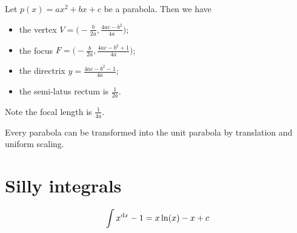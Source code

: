 \begin{lemma}
Let $p(x) = ax^2 + bx +c$ be a parabola. Then we have
\begin{itemize}
\item the vertex $V = \Big(-\frac{b}{2a}, \frac{4ac - b^2}{4a}\Big)$;
\item the focus $F = \Big(-\frac{b}{2a}, \frac{4ac - b^2+1}{4a}\Big)$;
\item the directrix $y = \frac{4ac - b^2 -1}{4a}$;
\item the semi-latus rectum is $\frac{1}{2a}$.
\end{itemize}
Note the focal length is $\frac{1}{4a}$.
\end{lemma}


\begin{lemma}
Every parabola can be transformed into the unit parabola by translation and uniform scaling.
\end{lemma}

\section{Silly integrals}
\[ \int x^{\operatorname{d \!} x}-1 = x\ln(x) - x +c \]